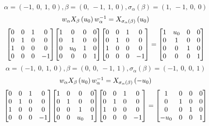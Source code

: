 \documentclass[11pt]{article}
\theoremstyle{definition}
\begin{document}
\[
\alpha = \left( -1, \  0, \  1, \  0\right), \beta = \left( 0, \  -1, \  1, \  0\right), \sigma_{\alpha}(\beta) = \left( 1, \  -1, \  0, \  0\right)
\]
\[
\scaletoalign{\textwidth}{w_{\alpha} X_{\beta}\left(u_{0}\right) w_{\alpha}^{-1} = X_{\sigma_{\alpha}\left(\beta\right)}\left(u_{0}\right)}
\]
\[
\scaletoalign{\textwidth}{{\left[\begin{matrix}0 & 0 & 1 & 0\\0 & 1 & 0 & 0\\1 & 0 & 0 & 0\\0 & 0 & 0 & -1\end{matrix}\right]} {\left[\begin{matrix}1 & 0 & 0 & 0\\0 & 1 & 0 & 0\\0 & u_{0} & 1 & 0\\0 & 0 & 0 & 1\end{matrix}\right]} {\left[\begin{matrix}0 & 0 & 1 & 0\\0 & 1 & 0 & 0\\1 & 0 & 0 & 0\\0 & 0 & 0 & -1\end{matrix}\right]} = {\left[\begin{matrix}1 & u_{0} & 0 & 0\\0 & 1 & 0 & 0\\0 & 0 & 1 & 0\\0 & 0 & 0 & 1\end{matrix}\right]}}
\]
\[
\alpha = \left( -1, \  0, \  1, \  0\right), \beta = \left( 0, \  0, \  -1, \  1\right), \sigma_{\alpha}(\beta) = \left( -1, \  0, \  0, \  1\right)
\]
\[
\scaletoalign{\textwidth}{w_{\alpha} X_{\beta}\left(u_{0}\right) w_{\alpha}^{-1} = X_{\sigma_{\alpha}\left(\beta\right)}\left(- u_{0}\right)}
\]
\[
\scaletoalign{\textwidth}{{\left[\begin{matrix}0 & 0 & 1 & 0\\0 & 1 & 0 & 0\\1 & 0 & 0 & 0\\0 & 0 & 0 & -1\end{matrix}\right]} {\left[\begin{matrix}1 & 0 & 0 & 0\\0 & 1 & 0 & 0\\0 & 0 & 1 & 0\\0 & 0 & u_{0} & 1\end{matrix}\right]} {\left[\begin{matrix}0 & 0 & 1 & 0\\0 & 1 & 0 & 0\\1 & 0 & 0 & 0\\0 & 0 & 0 & -1\end{matrix}\right]} = {\left[\begin{matrix}1 & 0 & 0 & 0\\0 & 1 & 0 & 0\\0 & 0 & 1 & 0\\- u_{0} & 0 & 0 & 1\end{matrix}\right]}}
\]
\end{document}
